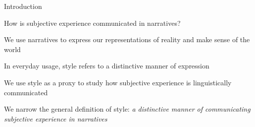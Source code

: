 \documentclass[10pt]{beamer}
\begin{document}




    

\begin{frame}{Introduction}

How is subjective experience communicated in narratives?

\vspace{0.5cm}
\pause

We use narratives to express our representations of reality and make sense of the world \citep{brunerActsMeaning1990}

\vspace{0.5cm}
\pause

In everyday usage, style refers to a distinctive manner of expression

\vspace{0.5cm}
\pause

We use style as a proxy to study how subjective experience is linguistically communicated

\vspace{0.5cm}
\pause

We narrow the general definition of style: \textit{a distinctive manner of communicating subjective experience in narratives}

\end{frame}
\end{document}
